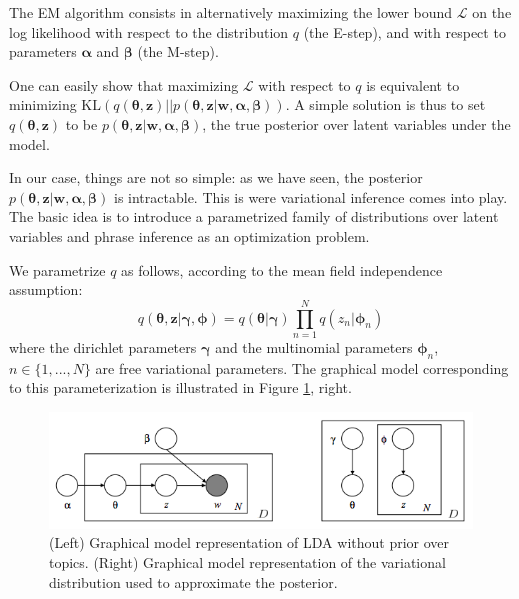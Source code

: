 \documentclass{article}
\begin{document}
The EM algorithm consists in alternatively maximizing the lower bound $\mathcal{L}$ on the log likelihood with respect to the distribution $q$ (the E-step), and with respect to parameters $\bm{\alpha}$ and $\bm{\beta}$ (the M-step).

One can easily show that maximizing $\mathcal{L}$ with respect to $q$ is equivalent to minimizing $\mathrm{KL}\left(q(\bm{\theta}, \mathbf{z}) || p(\bm{\theta}, \mathbf{z} | \mathbf{w}, \bm{\alpha}, \bm{\beta})\right)$. A simple solution is thus to set $q(\bm{\theta}, \mathbf{z})$ to be $p(\bm{\theta}, \mathbf{z} | \mathbf{w}, \bm{\alpha}, \bm{\beta})$, the true posterior over latent variables under the model.

In our case, things are not so simple: as we have seen, the posterior $p(\bm{\theta}, \mathbf{z} | \mathbf{w}, \bm{\alpha}, \bm{\beta})$ is intractable. This is were variational inference comes into play. The basic idea is to introduce a parametrized family of distributions over latent variables and phrase inference as an optimization problem. 

We parametrize $q$ as follows, according to the mean field independence assumption:
\begin{equation}
q(\bm{\theta}, \mathbf{z} | \bm{\gamma}, \bm{\phi}) =
q(\bm{\theta} | \bm{\gamma}) \prod_{n=1}^N q(z_n | \bm{\phi}_n)
\end{equation}
where the dirichlet parameters $\bm{\gamma}$ and the multinomial parameters $\bm{\phi}_n$, $n \in \{1,...,N\}$ are free variational parameters. The graphical model corresponding to this parameterization is illustrated in Figure \ref{graph_model2}, right.

\begin{figure}[ht]
\vskip 0.2in
\begin{center}
\centerline{\includegraphics[width=\columnwidth]{LDA_graph_model2}}
\caption{(Left) Graphical model representation of LDA without prior over topics. (Right) Graphical model representation of the variational distribution used to approximate the posterior.}
\label{graph_model2}
\end{center}
\vskip -0.2in
\end{figure} 
\end{document}
